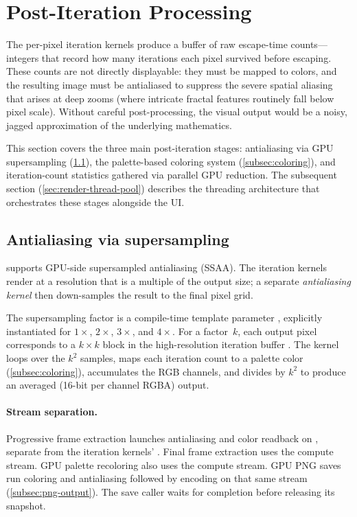 \section{Post-Iteration Processing}
\label{sec:misc-details}

The per-pixel iteration kernels produce a buffer of raw escape-time
counts---integers that record how many iterations each pixel survived
before escaping.  These counts are not directly displayable: they must
be mapped to colors, and the resulting image must be antialiased to
suppress the severe spatial aliasing that arises at deep zooms (where
intricate fractal features routinely fall below pixel scale).  Without
careful post-processing, the visual output would be a noisy, jagged
approximation of the underlying mathematics.

This section covers the three main post-iteration stages:
antialiasing via GPU supersampling (\cref{subsec:antialiasing}), the
palette-based coloring system (\cref{subsec:coloring}), and
iteration-count statistics gathered via parallel GPU reduction.  The
subsequent section (\cref{sec:render-thread-pool}) describes the
threading architecture that orchestrates these stages alongside the UI.

\subsection{Antialiasing via supersampling}
\label{subsec:antialiasing}

\FractalShark{} supports GPU-side supersampled antialiasing (SSAA).
The iteration kernels render at a resolution that is a multiple of
the output size; a separate \emph{antialiasing kernel} then
down-samples the result to the final pixel grid.

The supersampling factor is a compile-time template parameter
, explicitly instantiated for $1\times$, $2\times$,
$3\times$, and $4\times$.  For a factor~$k$, each output pixel
corresponds to a $k\times k$ block in the high-resolution iteration
buffer .  The kernel loops over the $k^2$
samples, maps each iteration count to a palette color
(\cref{subsec:coloring}), accumulates the RGB channels, and divides
by $k^2$ to produce an averaged  (16-bit per channel
RGBA) output.

\paragraph{Stream separation.}
Progressive frame extraction launches antialiasing and color readback
on , separate from the iteration kernels'
. Final frame extraction uses the compute stream.
GPU palette recoloring also uses the compute stream. GPU PNG saves run
coloring and antialiasing followed by encoding on that same stream
(\cref{subsec:png-output}).
The save caller waits for completion before releasing its snapshot.

